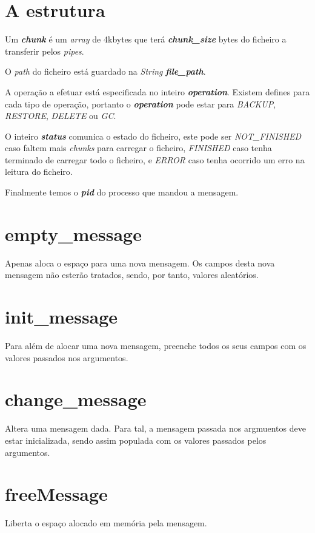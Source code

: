 \documentclass[12pt,a4paper]{report}
\begin{document}
\section{A estrutura}

\hspace{0cm}\par
Um \emph{\bfseries{chunk}} é um \emph{array} de 4kbytes que terá \emph{\bfseries{chunk\_size}} bytes do ficheiro a transferir pelos \emph{pipes}. \par
O \emph{path} do ficheiro está guardado na \emph{String} \emph{\bfseries{file\_path}}. \par
A operação a efetuar está especificada no inteiro \emph{\bfseries{operation}}. Existem defines para cada tipo de operação, portanto o \emph{\bfseries{operation}} pode estar para \emph{BACKUP}, \emph{RESTORE}, \emph{DELETE} ou \emph{GC}. \par
O inteiro \emph{\bfseries{status}} comunica o estado do ficheiro, este pode ser \emph{NOT\_FINISHED} caso faltem mais \emph{chunks} para carregar o ficheiro, \emph{FINISHED} caso tenha terminado de carregar todo o ficheiro, e \emph{ERROR} caso tenha ocorrido um erro na leitura do ficheiro.\par
Finalmente temos o \emph{\bfseries{pid}} do processo que mandou a mensagem.

\section{empty\_message}
Apenas aloca o espaço para uma nova mensagem. Os campos desta nova mensagem não esterão tratados, sendo, por tanto, valores aleatórios.\par

\section{init\_message}
Para além de alocar uma nova mensagem, preenche todos os seus campos com os valores passados nos argumentos.\par

\section{change\_message}
Altera uma mensagem dada. Para tal, a mensagem passada nos argmuentos deve estar inicializada, sendo assim populada com os valores passados pelos argumentos.

\section{freeMessage}
Liberta o espaço alocado em memória pela mensagem.
\end{document}
